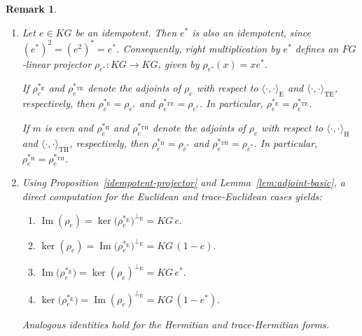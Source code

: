 \documentclass[11pt]{article}
\newtheorem{remark}[theorem]{Remark}
\begin{document}
\begin{remark}\label{propiedades-adjunto}
\begin{enumerate}
\item Let $e\in KG$ be an idempotent. Then $e^\ast$ is also an idempotent, since $(e^\ast)^2=(e^2)^\ast=e^\ast$. Consequently, right multiplication by $e^\ast$ defines an $FG$-linear projector $\rho_{e^\ast}:KG\longrightarrow KG$, given by $\rho_{e^\ast}(x)=xe^\ast$.

If $\rho_e^{\ast_{\mathrm E}}$ and $\rho_e^{\ast_{\mathrm{TE}}}$ denote the adjoints of $\rho_e$ with respect to $\langle\cdot,\cdot\rangle_{\mathrm E}$ and $\langle\cdot,\cdot\rangle_{\mathrm{TE}}$, respectively, then $\rho_e^{\ast_{\mathrm E}}=\rho_{e^\ast}$ and $\rho_e^{\ast_{\mathrm{TE}}}=\rho_{e^\ast}$. In particular, $\rho_e^{\ast_{\mathrm E}}=\rho_e^{\ast_{\mathrm{TE}}}$.

If $m$ is even and $\rho_e^{\ast_{\mathrm H}}$ and $\rho_e^{\ast_{\mathrm{TH}}}$ denote the adjoints of $\rho_e$ with respect to $\langle\cdot,\cdot\rangle_{\mathrm H}$ and $\langle\cdot,\cdot\rangle_{\mathrm{TH}}$, respectively, then $\rho_e^{\ast_{\mathrm H}}=\rho_{\overline e^\ast}$ and $\rho_e^{\ast_{\mathrm{TH}}}=\rho_{\overline e^\ast}$. In particular, $\rho_e^{\ast_{\mathrm H}}=\rho_e^{\ast_{\mathrm{TH}}}$.

\item Using Proposition~\ref{idempotent-projector} and  Lemma~\ref{lem:adjoint-basic}, a direct computation for the Euclidean and trace-Euclidean cases yields:
\begin{enumerate}
    \item $\operatorname{Im}(\rho_e) = \ker\big(\rho_e^{\ast_{\mathrm E}}\big)^{\perp_{\mathrm E}} = KG\,e.$
    \item $\ker(\rho_e) = \operatorname{Im}\big(\rho_e^{\ast_{\mathrm E}}\big)^{\perp_{\mathrm E}} = KG\,(1 - e).$
    \item $\operatorname{Im}\big(\rho_e^{\ast_{\mathrm E}}\big) = \ker(\rho_e)^{\perp_{\mathrm E}} = KG\,e^{\ast}.$
    \item $\ker\big(\rho_e^{\ast_{\mathrm E}}\big) = \operatorname{Im}(\rho_e)^{\perp_{\mathrm E}} = KG\,(1 - e^{\ast}).$
\end{enumerate}

Analogous identities hold for the Hermitian and trace-Hermitian forms.
\end{enumerate}
\end{remark}
\end{document}
